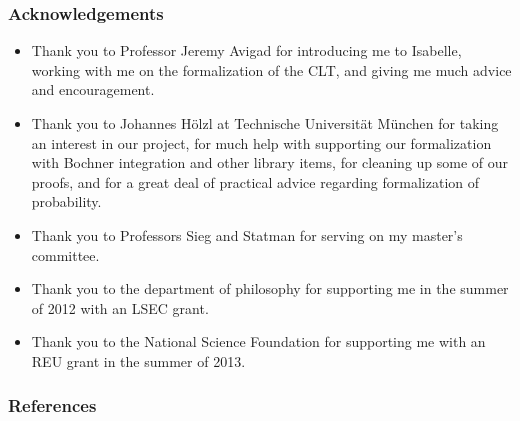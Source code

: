 \documentclass{beamer}
\begin{document}
\begin{frame}
\frametitle{Acknowledgements}
\begin{itemize}
\item Thank you to Professor Jeremy Avigad for introducing me to Isabelle, working with me on the formalization of the CLT, and giving me much advice and encouragement. \pause
\item Thank you to Johannes H\"olzl at Technische Universit\"at M\"unchen for taking an interest in our project, for much help with supporting our formalization with Bochner integration and other library items, for cleaning up some of our proofs, and for a great deal of practical advice regarding formalization of probability. \pause
\item Thank you to Professors Sieg and Statman for serving on my master's committee. \pause
\item Thank you to the department of philosophy for supporting me in the summer of 2012 with an LSEC grant. \pause
\item Thank you to the National Science Foundation for supporting me with an REU grant in the summer of 2013.
\end{itemize}
\end{frame}

\begin{frame}[allowframebreaks]
\frametitle{References}
\nocite{*}


\end{frame}
\end{document}
